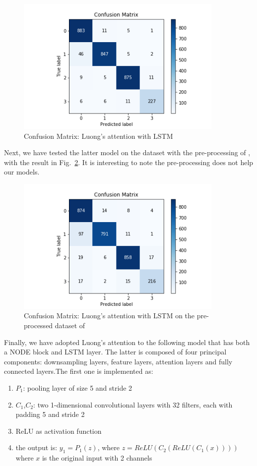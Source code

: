 \documentclass[LaM,binding=0.6cm]{sapthesis}
\begin{document}
\begin{figure}  \centering
    \includegraphics[width=100mm,scale=0.7]{lstmat2}
    \caption{Confusion Matrix: Luong's attention with LSTM}
    \label{fig:lstmat2}
\end{figure}
Next, we have tested the latter model on the dataset with the pre-processing of \cite{cnnfazeli}, with the result in Fig.~\ref{fig:lstmatcnn}. It is interesting to note the pre-processing does not help our models.
\begin{figure}  \centering
    \includegraphics[width=100mm,scale=0.7]{lstmatcnn}
    \caption{Confusion Matrix: Luong's attention with LSTM on the pre-processed dataset of \cite{cnnfazeli}}
    \label{fig:lstmatcnn}
\end{figure}
Finally, we have adopted Luong's attention to the following model that has both a NODE block and LSTM layer. The latter is composed of four principal components: downsampling layers, feature layers, attention layers and fully connected layers.The first one is implemented as:
\begin{enumerate}
\item $P_1$: pooling layer of size 5 and stride 2
\item $C_1$,$C_2$: two 1-dimensional convolutional layers with 32 filters, each with padding 5 and stride 2
\item ReLU as activation function
\item the output is: $y_1=P_1(z)$, where $z=ReLU(C_2(ReLU(C_1(x))))$ where $x$ is the original input with 2 channels
\end{enumerate}
\end{document}
